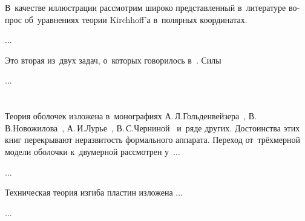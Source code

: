 
\begin{otherlanguage}{russian}

В~качестве иллюстрации рассмотрим широко представленный в~литературе вопрос об~уравнениях теории Kirchhoff’а в~полярных координатах.

...



\end{otherlanguage}



\begin{otherlanguage}{russian}

Это вторая из~двух задач, о~которых говорилось в~.
Силы

...




\end{otherlanguage}

\vspace{8mm}
\hfill\begin{minipage}[b]{0.95\linewidth}
\fontsize{10}{12}\selectfont

\section*{\wordforbibliography}

\begin{otherlanguage}{russian}

Теория оболочек изложена в~монографиях А.\,Л.\;Гольденвейзера~\cite{goldenveizer-thinshells}, В.\,В.\;Новожилова~\cite{novozhilov-theoryofthinshells}, А.\,И.\;Лурье~\cite{lurie-thinwalledshells}, В.\,С.\;Черниной~\cite{chernina-thinwalledshells} и~ряде других. Достоинства этих книг перекрывают неразвитость формального аппарата. Переход от~трёхмерной модели оболочки к~двумерной рассмотрен у~...

...

Техническая теория изгиба пластин изложена ...

...

\end{otherlanguage}

\end{minipage}
